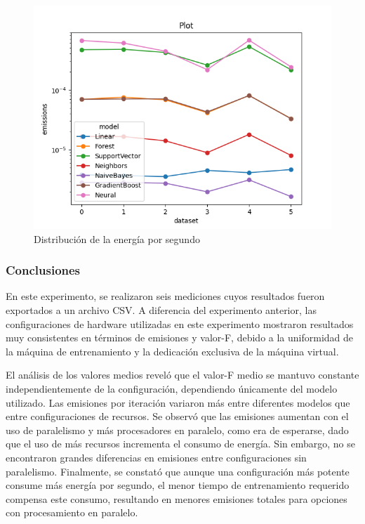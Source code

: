 \begin{figure}[H]
  \centerline{
     \includegraphics[width=\textwidth, keepaspectratio]{img/graph/2-line-emissions.png}
  }
  \caption{Distribución de la energía por segundo}
  \label{fig:4-2-line-total-emissions}
\end{figure}


\subsubsection{Conclusiones}

En este experimento, se realizaron seis mediciones cuyos resultados fueron exportados a un archivo CSV. A diferencia del experimento anterior, las configuraciones de hardware utilizadas en este experimento mostraron resultados muy consistentes en términos de emisiones y valor-F, debido a la uniformidad de la máquina de entrenamiento y la dedicación exclusiva de la máquina virtual.

El análisis de los valores medios reveló que el valor-F medio se mantuvo constante independientemente de la configuración, dependiendo únicamente del modelo utilizado. Las emisiones por iteración variaron más entre diferentes modelos que entre configuraciones de recursos. Se observó que las emisiones aumentan con el uso de paralelismo y más procesadores en paralelo, como era de esperarse, dado que el uso de más recursos incrementa el consumo de energía. Sin embargo, no se encontraron grandes diferencias en emisiones entre configuraciones sin paralelismo. Finalmente, se constató que aunque una configuración más potente consume más energía por segundo, el menor tiempo de entrenamiento requerido compensa este consumo, resultando en menores emisiones totales para opciones con procesamiento en paralelo.

\clearpage